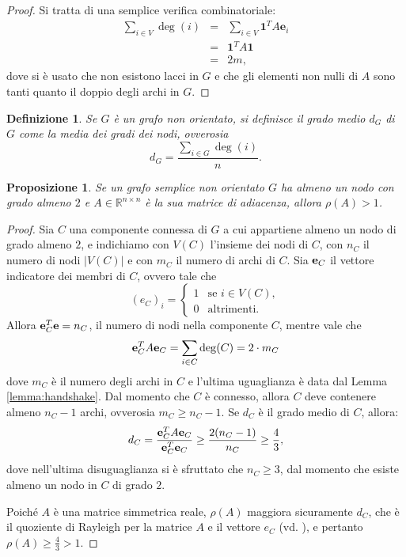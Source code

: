 \documentclass[a4paper]{article}
\newcommand{\RR}{\mathbb{R}}
\newcommand{\evec}{{\bf e}}
\newcommand{\bone}{\mathbf{1}}
\newcommand{\se}{\text{se }}
\newcommand{\altrimenti}{\text{altrimenti}}
\newtheorem{definition}{Definizione}
\newtheorem{proposition}{Proposizione}
\begin{document}
\begin{proof}
    Si tratta di una semplice verifica combinatoriale:
    \begin{eqnarray}
        \sum_{i \in V} \deg(i)
        &=& \sum_{i \in V} \bone^T A \mathbf{e}_i \nonumber \\
        &=& \bone^T A \bone \nonumber \\
        &=& 2m, \nonumber
    \end{eqnarray}
    dove si è usato che non esistono lacci in $G$ e che gli elementi
    non nulli di $A$ sono tanti quanto il doppio degli archi in $G$.
\end{proof}

\begin{definition}
    Se $G$ è un grafo non orientato, si definisce {\rm il grado medio} $d_G$ di $G$ come
    la media dei gradi dei nodi, ovverosia
    \[
        d_G = \frac{\sum_{i \in G} \deg(i)}{n}.
    \]
\end{definition}

\begin{proposition}
    \label{prop:spectral_radius}
    Se un grafo semplice non orientato $G$ ha almeno un nodo con grado almeno $2$ e $A \in \RR^{n \times n}$ è la sua matrice di adiacenza, allora $\rho(A) > 1$.
\end{proposition}

\begin{proof}
    Sia $C$ una componente connessa di $G$ a cui appartiene almeno un nodo
    di grado almeno $2$, e indichiamo con $V(C)$ l'insieme dei nodi di $C$,
    con $n_C$ il numero di nodi $|V(C)|$ e con $m_C$ il numero di archi di $C$. Sia $\evec_C$ il vettore indicatore dei membri di $C$, ovvero tale che
    \[
        (e_C)_i = \begin{cases}
            1 & \se i \in V(C), \\
            0 & \altrimenti.
        \end{cases} 
    \]
    Allora $\evec_C^T \evec = n_C$, il numero di nodi nella componente $C$, mentre vale che
    \[
        \evec_C^T A \evec_C = \sum_{i \in C} \deg(C) = 2 \cdot m_C
    \]
    dove $m_C$ è il numero
    degli archi in $C$
    e l'ultima uguaglianza è data dal Lemma \ref{lemma:handshake}. Dal momento che $C$ è connesso, allora $C$ deve contenere almeno $n_C-1$ archi, ovverosia
    $m_C \geq n_C - 1$. Se $d_C$ è il grado medio di $C$, allora:
    \[
        d_C = \frac{\evec_C^T A \evec_C}{\evec_C^T \evec_C} \geq \frac{2(n_C-1)}{n_C} \geq \frac{4}{3},
    \]
    dove nell'ultima disuguaglianza si è sfruttato che $n_C \geq 3$, dal momento che
    esiste almeno un nodo in $C$ di grado $2$.

    Poiché $A$ è una matrice simmetrica reale, $\rho(A)$ maggiora
    sicuramente $d_C$, che è il
    quoziente di Rayleigh per la matrice $A$ e il vettore $e_C$ (vd. \cite[Theorem 4.4.2]{friedland2015}),
    e pertanto $\rho(A) \geq \frac{4}{3} > 1$.
\end{proof}
\end{document}
